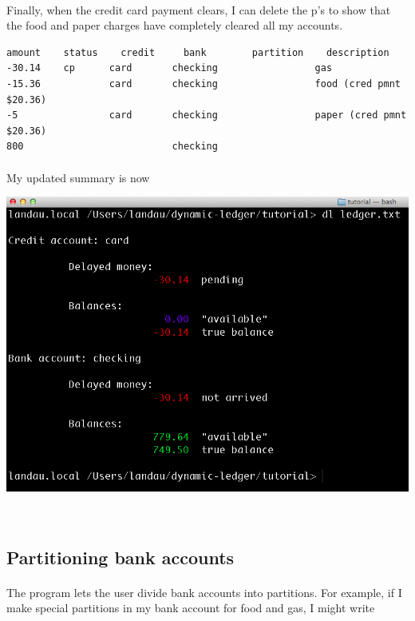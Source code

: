 \documentclass{article}
\providecommand{\q}{$\quad$ \newline}
\begin{document}
\begin{flushleft}
\paragraph{} Finally, when the credit card payment clears, I can delete the p's to show that the food and paper charges have completely cleared all my accounts.

\begin{lstlisting}[title=ledger.txt]
amount    status	credit     bank        partition    description
-30.14    cp      card       checking                 gas
-15.36            card       checking                 food (cred pmnt $20.36)
-5                card       checking                 paper (cred pmnt $20.36)
800                          checking
\end{lstlisting}

\paragraph{} My updated summary is now

\begin{center}
\includegraphics[scale=.45]{fig/sum7.png}
\end{center} \q



\subsection{Partitioning bank accounts}

\paragraph{} The program lets the user divide bank accounts into partitions. For example, if I make special partitions in my bank account for food and gas, I might write


\end{flushleft}
\end{document}
